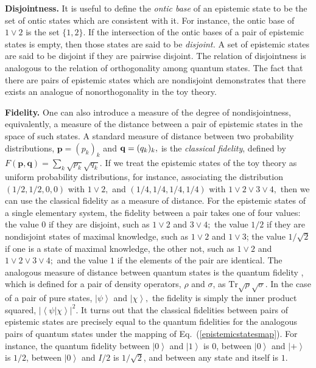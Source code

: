 \documentclass[pra,twocolumn,nofootinbib,showpacs]{revtex4}
\begin{document}
\textbf{Disjointness.} It is useful to define the \emph{ontic base }of an
epistemic state to be the set of ontic states which are consistent with it.
For instance, the ontic base of $1\vee 2$ is the set $\{1,2\}.$ If the
intersection of the ontic bases of a pair of epistemic states is empty, then
those states are said to be \emph{disjoint. }A set of epistemic states are
said to be disjoint if they are pairwise disjoint. The relation of
disjointness is analogous to the relation of orthogonality among quantum
states. The fact that there are pairs of epistemic states which are
nondisjoint demonstrates that there exists an analogue of nonorthogonality
in the toy theory.

\textbf{Fidelity.} One can also introduce a measure of the degree of
nondisjointness, equivalently, a measure of the distance between a pair of
epistemic states in the space of such states. A standard measure of distance
between two probability distributions, $\mathbf{p}=(p_{k})_{k}$ and $\mathbf{%
q}=(q_{k})_{k}\mathbf{,}$ is the \emph{classical fidelity}, defined by $F(%
\mathbf{p,q})=\sum_{k}\sqrt{p_{k}}\sqrt{q_{k}}.$ If we treat the epistemic
states of the toy theory as uniform probability distributions, for instance,
associating the distribution $(1/2,1/2,0,0)$ with $1\vee 2,$ and $%
(1/4,1/4,1/4,1/4)$ with $1\vee 2\vee 3\vee 4,$ then we can use the classical
fidelity as a measure of distance. For the epistemic states of a single
elementary system, the fidelity between a pair takes one of four values: the
value 0 if they are disjoint, such as $1\vee 2$ and $3\vee 4;$ the value $%
1/2 $ if they are nondisjoint states of maximal knowledge, such as $1\vee 2$
and $1\vee 3$; the value $1/\sqrt{2}$ if one is a state of maximal
knowledge, the other not, such as $1\vee 2$ and $1\vee 2\vee 3\vee 4;$ and
the value $1$ if the elements of the pair are identical. The analogous
measure of distance between quantum states is the quantum fidelity \cite%
{NielsenChuang}, which is defined for a pair of density operators, $\rho $
and $\sigma $, as $\mathrm{Tr}\sqrt{\rho }\sqrt{\sigma }.$ In the case of a
pair of pure states, $\left| \psi \right\rangle $ and $\left| \chi
\right\rangle ,$ the fidelity is simply the inner product squared, $\left|
\left\langle \psi |\chi \right\rangle \right| ^{2}.$ It turns out that the
classical fidelities between pairs of epistemic states are precisely equal
to the quantum fidelities for the analogous pairs of quantum states under
the mapping of Eq.~(\ref{epistemicstatesmap}). For instance, the quantum
fidelity between $\left| 0 \right\rangle$ and $\left| 1 \right\rangle$ is 0,
between $\left| 0 \right\rangle$ and $\left| + \right\rangle$ is $1/2$,
between $\left| 0 \right\rangle$ and $I/2$ is $1/\sqrt{2}$, and between any
state and itself is $1$.
\end{document}
